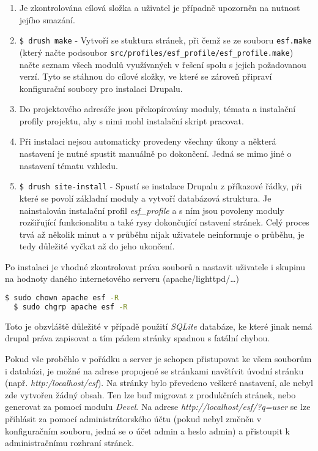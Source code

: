 \begin{enumerate}
  \item Je zkontrolována cílová složka a uživatel je případně upozorněn na nutnost jejího smazání.
  \item \lstinline[language=bash]{$ drush make} - Vytvoří se stuktura stránek, při čemž se ze souboru \texttt{esf.make} (který načte podsoubor \texttt{src/profiles/esf\_profile/esf\_profile.make}) načte seznam všech modulů využívaných v řešení spolu s jejich požadovanou verzí. Tyto se stáhnou do cílové složky, ve které se zároveň připraví konfigurační soubory pro instalaci Drupalu.
  \item Do projektového adresáře jsou překopírovány moduly, témata a instalační profily projektu, aby s nimi mohl instalační skript pracovat.
  \item Při instalaci nejsou automaticky provedeny všechny úkony a některá nastavení je nutné spustit manuálně po dokončení. Jedná se mimo jiné o nastavení tématu vzhledu.
  \item \lstinline[language=bash]{$ drush site-install} - Spustí se instalace Drupalu z příkazové řádky, při které se povolí základní moduly a vytvoří databázová struktura. Je nainstalován instalační profil \emph{esf\_profile} a s ním jsou povoleny moduly rozšiřující funkcionalitu a také rysy dokončující nstavení stránek. Celý proces trvá až několik minut a v průběhu nijak uživatele neinformuje o průběhu, je tedy důležité vyčkat až do jeho ukončení.
\end{enumerate}

Po instalaci je vhodné zkontrolovat práva souborů a nastavit uživatele i skupinu na hodnoty daného internetového serveru (apache/lighttpd/\dots)

\begin{lstlisting}[language=bash]
  $ sudo chown apache esf -R 
  $ sudo chgrp apache esf -R
\end{lstlisting}

Toto je obzvláště důležité v případě použití \emph{SQLite} databáze, ke které jinak nemá drupal práva zapisovat a tím pádem stránky spadnou s fatální chybou. 

Pokud vše proběhlo v pořádku a server je schopen přistupovat ke všem souborům i databázi, je možné na adrese propojené se stránkami navštívit úvodní stránku (např. \emph{http:/localhost/esf}). Na stránky bylo převedeno veškeré nastavení, ale nebyl zde vytvořen žádný obsah. Ten lze buď migrovat z produkčních stránek, nebo generovat za pomocí modulu \emph{Devel}. Na adrese \emph{http://localhost/esf/?q=user} se lze přihlásit za pomocí administrátorského účtu (pokud nebyl změněn v konfiguračním souboru, jedná se o účet admin a heslo admin) a přistoupit k administračnímu rozhraní stránek.

